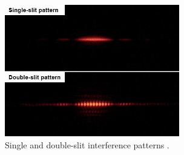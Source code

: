 \documentclass[prb,preprint]{revtex4-1}
\begin{document}
\begin{abstract}

\end{abstract}

\begin{figure}[b]
\centering
\includegraphics[width=3in]{image1.jpg}
\caption{Single and double-slit interference patterns \cite{wik}.}
\label{image}
\end{figure}
\end{document}
